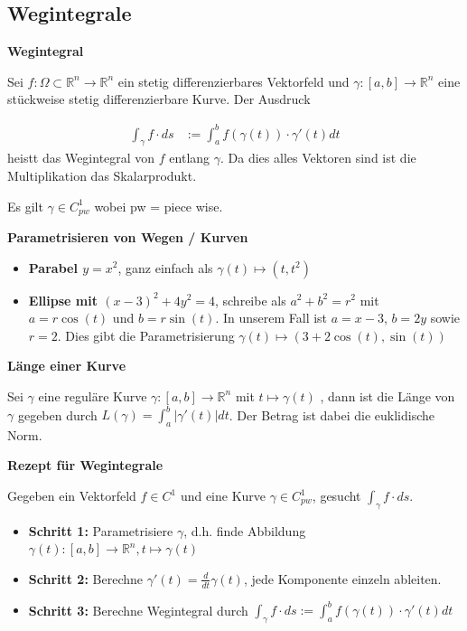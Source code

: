 \documentclass[25pt]{sciposter}
\newcommand{\R}{\mathbb{R}}
\newenvironment{method}[1]{\begin{mdframed}[backgroundcolor=blue!10,innertopmargin=15pt, innerbottommargin=15pt, nobreak=true]
		\textbf{#1 }
	}
	{ 
	\end{mdframed}
}
\begin{document}
\begin{multicols}{3}




\section*{Wegintegrale}

\begin{method}{Wegintegral}
	Sei $f:\Omega \subset \R^n \to \R^n$ ein stetig differenzierbares Vektorfeld und $\gamma:[a,b]\to \R^n$ eine stückweise stetig differenzierbare Kurve. Der Ausdruck
	
	\begin{align*}
		\int_\gamma f \cdot ds &:= \int_{a}^{b} f(\gamma(t)) \cdot \gamma'(t) dt
	\end{align*}
	heistt das Wegintegral von $f$ entlang $\gamma$. Da dies alles Vektoren sind ist die Multiplikation das Skalarprodukt.
	
	Es gilt $\gamma  \in C^1_{pw}$ wobei pw = piece wise.
\end{method}

\textbf{Parametrisieren von Wegen / Kurven}
\begin{itemize}
	\item \textbf{Parabel $y=x^2$}, ganz einfach als $\gamma(t)\mapsto (t,t^2)$
	\item \textbf{Ellipse mit $(x-3)^2+4y^2 = 4$}, schreibe als $a^2 + b^2 = r^2$ mit $a = r\cos(t)$ und $b = r\sin(t)$. In unserem Fall ist $a = x-3$, $b=2y$ sowie $r = 2$. Dies gibt die Parametrisierung $\gamma(t) \mapsto (3+2\cos(t),\sin(t))$
\end{itemize}




\begin{method}{Länge einer Kurve}
	Sei $\gamma$ eine reguläre Kurve $\gamma : [a,b]\to \R^n$ mit $t \mapsto \gamma(t)$ , dann ist die Länge von $\gamma$ gegeben durch $L(\gamma) = \int_{a}^{b} |\gamma'(t)| dt$. Der Betrag ist dabei die euklidische Norm.
\end{method}

\begin{method}{Rezept für Wegintegrale}
	Gegeben ein Vektorfeld $f \in C^1$ und eine Kurve $\gamma \in C^1_{pw}$, gesucht $\int_\gamma f\cdot ds$.
	\begin{itemize}
		\item \textbf{Schritt 1:} Parametrisiere $\gamma$, d.h. finde Abbildung $\gamma(t):[a,b]\to\R^n,t\mapsto\gamma(t)$
		\item \textbf{Schritt 2:} Berechne $\gamma'(t) = \frac{d}{dt} \gamma(t)$, jede Komponente einzeln ableiten.
		\item \textbf{Schritt 3:} Berechne Wegintegral durch $\int_\gamma f\cdot ds := \int_{a}^{b} f(\gamma(t)) \cdot \gamma' (t) dt$
	\end{itemize}
	

\end{method}
\end{multicols}
\end{document}

